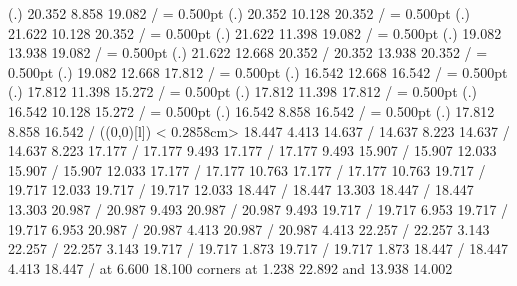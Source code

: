{\setplotsymbol ({\thinlinefont .})
 20.352  8.858 19.082 /
%
%
\linethickness= 0.500pt
\setplotsymbol ({\thinlinefont .})
 20.352 10.128 20.352 /
%
%
\linethickness= 0.500pt
\setplotsymbol ({\thinlinefont .})
 21.622 10.128 20.352 /
%
%
\linethickness= 0.500pt
\setplotsymbol ({\thinlinefont .})
 21.622 11.398 19.082 /
%
%
\linethickness= 0.500pt
\setplotsymbol ({\thinlinefont .})
 19.082 13.938 19.082 /
%
%
\linethickness= 0.500pt
\setplotsymbol ({\thinlinefont .})
 21.622 12.668 20.352 /
 20.352 13.938 20.352 /
%
%
\linethickness= 0.500pt
\setplotsymbol ({\thinlinefont .})
 19.082 12.668 17.812 /
%
%
\linethickness= 0.500pt
\setplotsymbol ({\thinlinefont .})
 16.542 12.668 16.542 /
%
%
\linethickness= 0.500pt
\setplotsymbol ({\thinlinefont .})
 17.812 11.398 15.272 /
%
%
\linethickness= 0.500pt
\setplotsymbol ({\thinlinefont .})
 17.812 11.398 17.812 /
%
%
\linethickness= 0.500pt
\setplotsymbol ({\thinlinefont .})
 16.542 10.128 15.272 /
%
%
\linethickness= 0.500pt
\setplotsymbol ({\thinlinefont .})
 16.542  8.858 16.542 /
%
%
\linethickness= 0.500pt
\setplotsymbol ({\thinlinefont .})
 17.812  8.858 16.542 /
%
%
\linethickness=1pt
\setplotsymbol ({\makebox(0,0)[l]{\tencirc{}}})
\setdashes < 0.2858cm>
 18.447  4.413 14.637 /
 14.637  8.223 14.637 /
 14.637  8.223 17.177 /
 17.177  9.493 17.177 /
 17.177  9.493 15.907 /
 15.907 12.033 15.907 /
 15.907 12.033 17.177 /
 17.177 10.763 17.177 /
 17.177 10.763 19.717 /
 19.717 12.033 19.717 /
 19.717 12.033 18.447 /
 18.447 13.303 18.447 /
 18.447 13.303 20.987 /
 20.987  9.493 20.987 /
 20.987  9.493 19.717 /
 19.717  6.953 19.717 /
 19.717  6.953 20.987 /
 20.987  4.413 20.987 /
 20.987  4.413 22.257 /
 22.257  3.143 22.257 /
 22.257  3.143 19.717 /
 19.717  1.873 19.717 /
 19.717  1.873 18.447 /
 18.447  4.413 18.447 /
%
%
 at  6.600 18.100
\linethickness=0pt
\putrectangle corners at  1.238 22.892 and 13.938 14.002
\endpicture}
